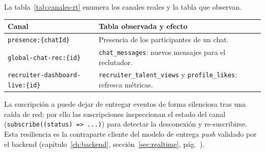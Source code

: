 La tabla~\ref{tab:canales-rt} enumera los canales reales y la tabla que observan.

\vspace{0.2cm}
\noindent
\renewcommand{\arraystretch}{1.3}
\fontsize{8.5}{10.2}\selectfont\sffamily
\begin{tabularx}{\textwidth}{|L{4.4cm}|Y|}
\hline
{}
\sffamily\textbf{Canal} & \sffamily\textbf{Tabla observada y efecto} \\
\hline
\texttt{presence:\{chatId\}} & Presencia de los participantes de un chat. \\ \hline
{}
\texttt{global-chat-rec:\{id\}} & \texttt{chat\_messages}: nuevos mensajes para el reclutador. \\ \hline
\texttt{recruiter-dashboard-live:\{id\}} & \texttt{recruiter\_talent\_views} y \texttt{profile\_likes}: refresca métricas. \\ \hline
\end{tabularx}
\label{tab:canales-rt}

\begin{NotaTecnica}
La suscripción a  puede dejar de entregar eventos de forma
silenciosa tras una caída de red; por ello las suscripciones inspeccionan el estado del
canal (\texttt{subscribe((status) => ...)}) para detectar la desconexión y re-suscribirse.
Esta resiliencia es la contraparte cliente del modelo de entrega \textit{push} validado por
el backend (capítulo~\ref{ch:backend}, sección~\ref{sec:realtime},
pág.~\pageref{sec:realtime}).
\end{NotaTecnica}
